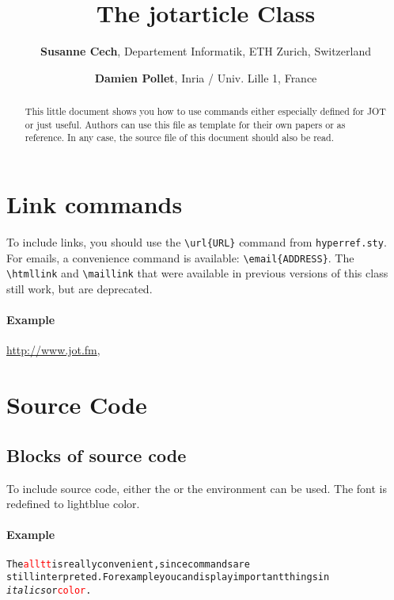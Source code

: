 \documentclass{jotarticle}
\title{The jotarticle Class}
\author{%
    \textbf{Susanne Cech}, Departement Informatik, ETH Zurich, Switzerland \and
    \textbf{Damien Pollet}, Inria / Univ. Lille 1, France
}
\begin{document}

\begin{abstract}
This little document shows you how to use commands either especially
defined for JOT or just useful. Authors can use this file as template
for their own papers or as reference. In any case, the source file
of this document should also be read.
\end{abstract}


\section{Link commands}

To include links, you should use the \verb|\url{URL}| command from \verb|hyperref.sty|. For emails, a convenience command is available: \verb|\email{ADDRESS}|.
The \verb|\htmllink| and \verb|\maillink| that were available in previous versions of this class still work, but are deprecated.

\paragraph{Example} \url{http://www.jot.fm}, 



\section{Source Code}

\subsection{Blocks of source code}

To include source code, either the  or the 
environment can be used. The font is redefined to lightblue color.

\paragraph{Example}
\begin{alltt}
The \textcolor{red}{alltt} is really convenient, since commands are 
still interpreted. For example you can display important things in 
\textit{italics} or \textcolor{red}{color}.
\end{alltt}
\end{document}
